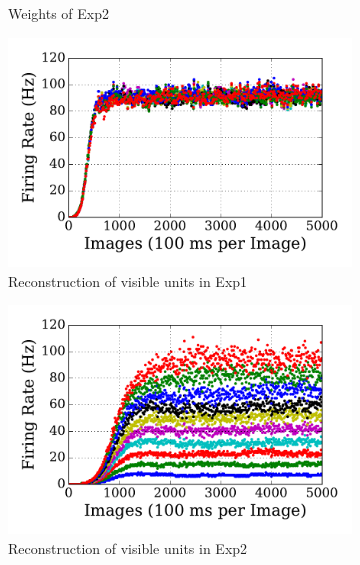 \begin{figure}
\begin{subfigure}[t]{0.45\textwidth}
		\caption{Weights of Exp2}
	\end{subfigure}
	\begin{subfigure}[t]{0.45\textwidth}
		\includegraphics[width=\textwidth]{pics_sdlm/00_exp_SAE_Orig/exp1_recon_s.pdf}
		\caption{Reconstruction of visible units in Exp1}
	\end{subfigure}
	\begin{subfigure}[t]{0.45\textwidth}
		\includegraphics[width=\textwidth]{pics_sdlm/00_exp_SAE_Orig/exp2_recon_s.pdf}
		\caption{Reconstruction of visible units in Exp2}
	\end{subfigure}\\
	\begin{subfigure}[t]{0.45\textwidth}

\end{subfigure}
\end{figure}
